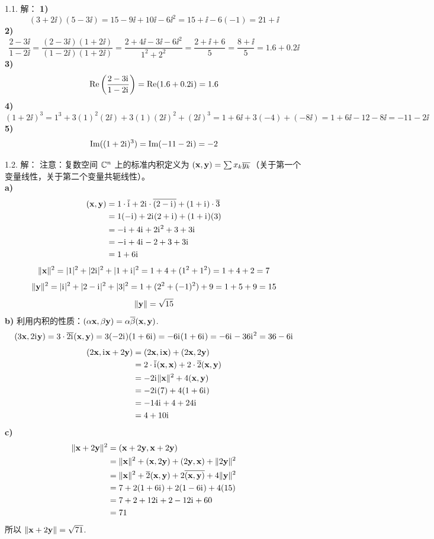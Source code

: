 \begin{exer}


1.1. 解：
\textbf{1)}
$$ (3 + 2\ii)(5 - 3\ii) = 15 - 9\ii + 10\ii - 6\ii^2 = 15 + \ii - 6(-1) = 21 + \ii $$
\textbf{2)}
$$ \frac{2 - 3\ii}{1 - 2\ii} = \frac{(2 - 3\ii)(1 + 2\ii)}{(1 - 2\ii)(1 + 2\ii)} = \frac{2 + 4\ii - 3\ii - 6\ii^2}{1^2 + 2^2} = \frac{2 + \ii + 6}{5} = \frac{8 + \ii}{5} = 1.6 + 0.2\ii $$
\textbf{3)}
$$ \ReR\left(\frac{2 - 3\ii}{1 - 2\ii}\right) = \ReR(1.6 + 0.2\ii) = 1.6 $$
\textbf{4)}
$$ (1 + 2\ii)^3 = 1^3 + 3(1)^2(2\ii) + 3(1)(2\ii)^2 + (2\ii)^3 = 1 + 6\ii + 3(-4) + (-8\ii) = 1 + 6\ii - 12 - 8\ii = -11 - 2\ii $$
\textbf{5)}
$$ \ImI((1 + 2\ii)^3) = \ImI(-11 - 2\ii) = -2 $$

1.2. 解：
注意：复数空间 $\CC^n$ 上的标准内积定义为 $(\xx, \yy) = \sum x_k \overline{y_k}$（关于第一个变量线性，关于第二个变量共轭线性）。
\\
\textbf{a)}
$$
\begin{aligned}
(\xx, \yy) &= 1 \cdot \overline{\ii} + 2\ii \cdot \overline{(2 - \ii)} + (1 + \ii) \cdot \overline{3} \\
&= 1(-\ii) + 2\ii(2 + \ii) + (1 + \ii)(3) \\
&= -\ii + 4\ii + 2\ii^2 + 3 + 3\ii \\
&= -\ii + 4\ii - 2 + 3 + 3\ii \\
&= 1 + 6\ii
\end{aligned}
$$
$$ \|\xx\|^2 = |1|^2 + |2\ii|^2 + |1 + \ii|^2 = 1 + 4 + (1^2 + 1^2) = 1 + 4 + 2 = 7 $$
$$ \|\yy\|^2 = |\ii|^2 + |2 - \ii|^2 + |3|^2 = 1 + (2^2 + (-1)^2) + 9 = 1 + 5 + 9 = 15 $$
$$ \|\yy\| = \sqrt{15} $$
\textbf{b)}
利用内积的性质：$(\alpha \xx, \beta \yy) = \alpha \overline{\beta} (\xx, \yy)$.
$$ (3\xx, 2\ii \yy) = 3 \cdot \overline{2\ii} (\xx, \yy) = 3(-2\ii)(1 + 6\ii) = -6\ii(1 + 6\ii) = -6\ii - 36\ii^2 = 36 - 6\ii $$
$$
\begin{aligned}
(2\xx, \ii\xx + 2\yy) &= (2\xx, \ii\xx) + (2\xx, 2\yy) \\
&= 2 \cdot \overline{\ii} (\xx, \xx) + 2 \cdot \overline{2} (\xx, \yy) \\
&= -2\ii \|\xx\|^2 + 4 (\xx, \yy) \\
&= -2\ii(7) + 4(1 + 6\ii) \\
&= -14\ii + 4 + 24\ii \\
&= 4 + 10\ii
\end{aligned}
$$
\textbf{c)}
$$
\begin{aligned}
\|\xx + 2\yy\|^2 &= (\xx + 2\yy, \xx + 2\yy) \\
&= \|\xx\|^2 + (\xx, 2\yy) + (2\yy, \xx) + \|2\yy\|^2 \\
&= \|\xx\|^2 + \overline{2}(\xx, \yy) + 2\overline{(\xx, \yy)} + 4\|\yy\|^2 \\
&= 7 + 2(1 + 6\ii) + 2(1 - 6\ii) + 4(15) \\
&= 7 + 2 + 12\ii + 2 - 12\ii + 60 \\
&= 71
\end{aligned}
$$
所以 $\|\xx + 2\yy\| = \sqrt{71}$.


\end{exer}
